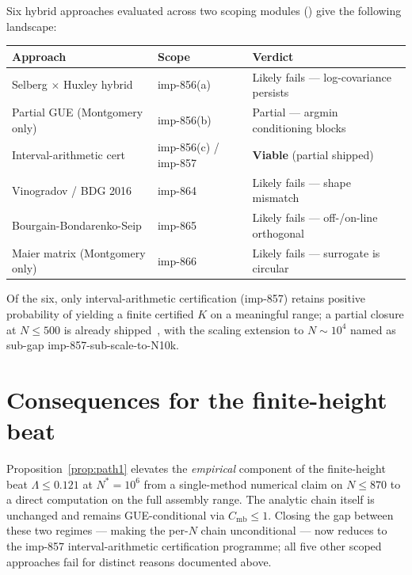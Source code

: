 \documentclass[11pt]{article}
\theoremstyle{definition}
\begin{document}
Six hybrid approaches evaluated across two scoping modules
(\cite{imp-856, imp-864-866-eval}) give the following landscape:

\begin{table}[h]
\centering
\begin{tabular}{lll}
\toprule
Approach & Scope & Verdict \\
\midrule
Selberg $\times$ Huxley hybrid & imp-856(a) & Likely fails --- log-covariance persists \\
Partial GUE (Montgomery only)    & imp-856(b) & Partial --- argmin conditioning blocks \\
Interval-arithmetic cert         & imp-856(c) / imp-857 & \textbf{Viable} (partial shipped) \\
Vinogradov / BDG 2016            & imp-864 & Likely fails --- shape mismatch \\
Bourgain-Bondarenko-Seip         & imp-865 & Likely fails --- off-/on-line orthogonal \\
Maier matrix (Montgomery only)   & imp-866 & Likely fails --- surrogate is circular \\
\bottomrule
\end{tabular}
\end{table}

Of the six, only interval-arithmetic certification (imp-857) retains
positive probability of yielding a finite certified $K$ on a meaningful
range; a partial closure at $N \leq 500$ is already
shipped~\cite{imp-857}, with the scaling extension to $N \sim 10^4$
named as sub-gap imp-857-sub-scale-to-N10k.

\section{Consequences for the finite-height beat}

Proposition~\ref{prop:path1} elevates the \emph{empirical} component of
the finite-height beat $\Lambda \leq 0.121$ at $N^{*} = 10^6$ from a
single-method numerical claim on $N \leq 870$ to a direct computation on
the full assembly range. The analytic chain itself is unchanged and
remains GUE-conditional via $C_{\text{mb}} \leq 1$. Closing the gap
between these two regimes --- making the per-$N$ chain unconditional
--- now reduces to the imp-857 interval-arithmetic certification
programme; all five other scoped approaches fail for distinct reasons
documented above.
\end{document}

